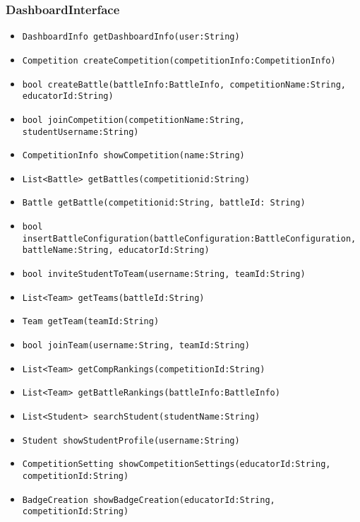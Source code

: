 \subsubsection{DashboardInterface}
\begin{itemize}
    \item \texttt{DashboardInfo getDashboardInfo(user:String)}%
    \item \texttt{Competition createCompetition(competitionInfo:CompetitionInfo)}%
    \item \texttt{bool createBattle(battleInfo:BattleInfo, competitionName:String,\\educatorId:String)}%
    \item \texttt{bool joinCompetition(competitionName:String, studentUsername:String)}%
    \item \texttt{CompetitionInfo showCompetition(name:String)}%
    \item \texttt{List<Battle> getBattles(competitionid:String)}%
    \item \texttt{Battle getBattle(competitionid:String, battleId: String)}
    \item \texttt{bool insertBattleConfiguration(battleConfiguration:BattleConfiguration, battleName:String, educatorId:String)}%
    \item \texttt{bool inviteStudentToTeam(username:String, teamId:String)}%
    \item \texttt{List<Team> getTeams(battleId:String)}%
    \item \texttt{Team getTeam(teamId:String)}%
    \item \texttt{bool joinTeam(username:String, teamId:String)}%
    \item \texttt{List<Team> getCompRankings(competitionId:String)}
    \item \texttt{List<Team> getBattleRankings(battleInfo:BattleInfo)}
    \item \texttt{List<Student> searchStudent(studentName:String)}%
    \item \texttt{Student showStudentProfile(username:String)}%
    \item \texttt{CompetitionSetting showCompetitionSettings(educatorId:String,\\competitionId:String)}%
    \item \texttt{BadgeCreation showBadgeCreation(educatorId:String, competitionId:String)}%

\end{itemize}
